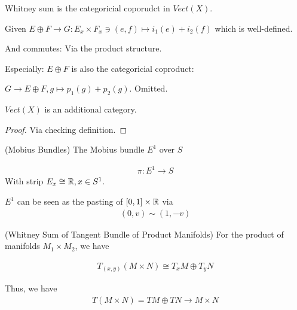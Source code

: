 \documentclass[Total.tex]{subfiles}
\begin{document}
	Whitney sum is the categoricial coporudct in $Vect(X)$. 
	\begin{center}
	\end{center}
	
	Given $E\oplus F\rightarrow G:E_x\times F_x\ni (e,f)\mapsto i_1(e)+i_2(f)$ which is well-defined. 
	
	And commutes: Via the product structure. 
	
	Especially: $E\oplus F$ is also the categoricial coproduct:
	
	\begin{center}
	\end{center}
	
	$G\rightarrow E\oplus F,g\mapsto p_1(g)+ p_2(g)$. Omitted.
	
	\begin{corollary}
		$Vect(X)$ is an additional category.
	\end{corollary}
	\begin{proof}
		Via checking definition.
	\end{proof}
	
	\begin{example}
		(Mobius Bundles) The Mobius bundle $E^1$ over $S$
		
		\begin{gather*}
			\pi:E^1\rightarrow S
		\end{gather*}
		With strip $E_x\cong \mathbb{R},x\in S^1$. 
		
		$E^1$ can be seen as the pasting of $[0,1]\times \mathbb{R}$ via
		\begin{gather*}
			(0,v)\sim (1,-v)
		\end{gather*}
	\end{example}
	
	\begin{example}
		(Whitney Sum of Tangent Bundle of Product Manifolds) For the product of manifolds $M_1\times M_2$, we have
		
		\begin{gather*}
			T_{(x,y)}(M\times N)\cong T_x M\oplus T_y N
		\end{gather*}
		
		Thus, we have
		\begin{gather*}
			T(M\times N)=TM\oplus TN\rightarrow M\times N
		\end{gather*}
	\end{example}
	
\end{document}
